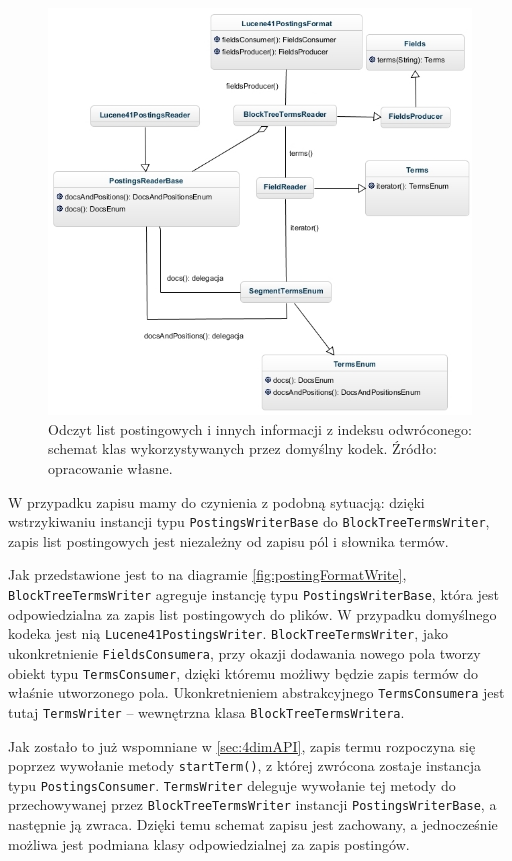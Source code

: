 \begin{figure}[p]
 \includegraphics[scale=0.67]{pictures/Lucene41PostingsFormatRead_2.jpg}
 \caption{Odczyt list postingowych i innych informacji z indeksu odwróconego: schemat klas wykorzystywanych przez domyślny kodek. Źródło: opracowanie własne. \label{fig:postingFormatRead}}
\end{figure}

W przypadku zapisu mamy do czynienia z podobną sytuacją: dzięki wstrzykiwaniu instancji typu \texttt{PostingsWriterBase} do \texttt{BlockTreeTermsWriter}, zapis list postingowych jest niezależny od zapisu pól i słownika termów.

Jak przedstawione jest to na diagramie \ref{fig:postingFormatWrite}, \texttt{BlockTreeTermsWriter} agreguje instancję typu \texttt{PostingsWriterBase}, która jest odpowiedzialna za zapis list postingowych do plików. W przypadku domyślnego kodeka jest nią \texttt{Lucene41PostingsWriter}. \texttt{BlockTreeTermsWriter}, jako ukonkretnienie \texttt{FieldsConsumera}, przy okazji dodawania nowego pola tworzy obiekt typu \texttt{TermsConsumer}, dzięki któremu możliwy będzie zapis termów do właśnie utworzonego pola. Ukonkretnieniem abstrakcyjnego \texttt{TermsConsumera} jest tutaj \texttt{TermsWriter} -- wewnętrzna klasa \texttt{BlockTreeTermsWritera}.

Jak zostało to już wspomniane w \ref{sec:4dimAPI}, zapis termu rozpoczyna się poprzez wywołanie metody \texttt{startTerm()}, z której zwrócona zostaje instancja typu \texttt{PostingsConsumer}. \texttt{TermsWriter} deleguje wywołanie tej metody do przechowywanej przez \texttt{BlockTreeTermsWriter} instancji \texttt{PostingsWriterBase}, a następnie ją zwraca. Dzięki temu schemat zapisu jest zachowany, a jednocześnie możliwa jest podmiana klasy odpowiedzialnej za zapis postingów.

